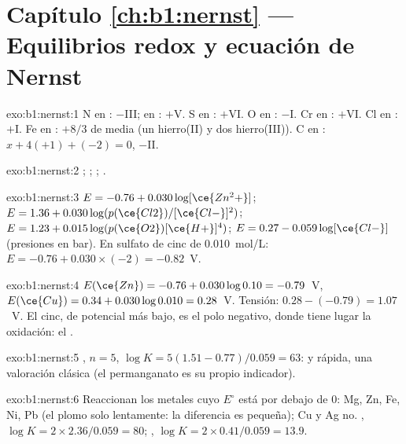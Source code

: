 \section*{Capítulo \ref{ch:b1:nernst} --- Equilibrios redox y ecuación de Nernst}

\begin{solution}{exo:b1:nernst:1}
N en : $-$III; en : $+$V. S en : $+$VI. O en
: $-$I. Cr en : $+$VI. Cl en : $+$I. Fe en
: $+8/3$ de media (un hierro(II) y dos hierro(III)). C en
: $x + 4(+1) + (-2) = 0$, $-$II.
\end{solution}

\begin{solution}{exo:b1:nernst:2}
;
;
;
.
\end{solution}

\begin{solution}{exo:b1:nernst:3}
$E = -0.76 + 0.030\log[\ce{Zn^2+}]$; $E = 1.36 + 0.030\log(p(\ce{Cl2})/[\ce{Cl-}]^2)$;
$E = 1.23 + 0.015\log(p(\ce{O2})[\ce{H+}]^4)$; $E = 0.27 - 0.059\log[\ce{Cl-}]$
(presiones en bar). En sulfato de cinc de \qty{0.010}{mol/L}:
$E = -0.76 + 0.030 \times (-2) = -0.82$~V.
\end{solution}

\begin{solution}{exo:b1:nernst:4}
$E(\ce{Zn}) = -0.76 + 0.030\log 0.10 = -0.79$~V, $E(\ce{Cu}) = 0.34 +
0.030\log 0.010 = 0.28$~V. Tensión: $0.28 - (-0.79) = 1.07$~V. El cinc,
de potencial más bajo, es el polo negativo, donde tiene lugar la
oxidación: el .
\end{solution}

\begin{solution}{exo:b1:nernst:5}
, $n = 5$,
$\log K = 5(1.51 - 0.77)/0.059 = 63$:  y rápida, una
valoración clásica (el permanganato es su propio indicador).
\end{solution}

\begin{solution}{exo:b1:nernst:6}
Reaccionan los metales cuyo $E^\circ$ está por debajo de 0: Mg, Zn, Fe,
Ni, Pb (el plomo solo lentamente: la diferencia es pequeña); Cu y Ag no.
, $\log K = 2 \times 2.36/0.059 = 80$;
, $\log K = 2 \times 0.41/0.059 = 13.9$.
\end{solution}

